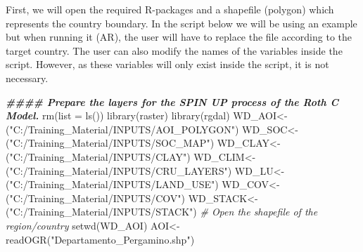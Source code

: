 \documentclass[
  10pt,
  b5paper,
]{book}
\newenvironment{Shaded}{\begin{snugshade}}{\end{snugshade}}
\newcommand{\AttributeTok}[1]{\textcolor[rgb]{0.77,0.63,0.00}{#1}}
\newcommand{\CommentTok}[1]{\textcolor[rgb]{0.56,0.35,0.01}{\textit{#1}}}
\newcommand{\DocumentationTok}[1]{\textcolor[rgb]{0.56,0.35,0.01}{\textbf{\textit{#1}}}}
\newcommand{\FunctionTok}[1]{\textcolor[rgb]{0.00,0.00,0.00}{#1}}
\newcommand{\NormalTok}[1]{#1}
\newcommand{\OtherTok}[1]{\textcolor[rgb]{0.56,0.35,0.01}{#1}}
\newcommand{\StringTok}[1]{\textcolor[rgb]{0.31,0.60,0.02}{#1}}
\begin{document}
First, we will open the required R-packages and a shapefile (polygon) which represents the country boundary. In the script below we will be using an example but when running it (AR), the user will have to replace the file according to the target country. The user can also modify the names of the variables inside the script. However, as these variables will only exist inside the script, it is not necessary.

\begin{Shaded}
\begin{Highlighting}[]
\DocumentationTok{\#\#\#\# Prepare the layers for the SPIN UP process of the Roth C Model. }
\FunctionTok{rm}\NormalTok{(}\AttributeTok{list =} \FunctionTok{ls}\NormalTok{())}
\FunctionTok{library}\NormalTok{(raster)}
\FunctionTok{library}\NormalTok{(rgdal)}
\NormalTok{WD\_AOI}\OtherTok{\textless{}{-}}\NormalTok{(}\StringTok{"C:/Training\_Material/INPUTS/AOI\_POLYGON"}\NormalTok{)}
\NormalTok{WD\_SOC}\OtherTok{\textless{}{-}}\NormalTok{(}\StringTok{"C:/Training\_Material/INPUTS/SOC\_MAP"}\NormalTok{)}
\NormalTok{WD\_CLAY}\OtherTok{\textless{}{-}}\NormalTok{(}\StringTok{"C:/Training\_Material/INPUTS/CLAY"}\NormalTok{)}
\NormalTok{WD\_CLIM}\OtherTok{\textless{}{-}}\NormalTok{(}\StringTok{"C:/Training\_Material/INPUTS/CRU\_LAYERS"}\NormalTok{)}
\NormalTok{WD\_LU}\OtherTok{\textless{}{-}}\NormalTok{(}\StringTok{"C:/Training\_Material/INPUTS/LAND\_USE"}\NormalTok{)}
\NormalTok{WD\_COV}\OtherTok{\textless{}{-}}\NormalTok{(}\StringTok{"C:/Training\_Material/INPUTS/COV"}\NormalTok{)}
\NormalTok{WD\_STACK}\OtherTok{\textless{}{-}}\NormalTok{(}\StringTok{"C:/Training\_Material/INPUTS/STACK"}\NormalTok{)}
\CommentTok{\# Open the shapefile of the region/country}
\FunctionTok{setwd}\NormalTok{(WD\_AOI)}
\NormalTok{AOI}\OtherTok{\textless{}{-}}\FunctionTok{readOGR}\NormalTok{(}\StringTok{"Departamento\_Pergamino.shp"}\NormalTok{)}


\end{Highlighting}
\end{Shaded}
\end{document}
